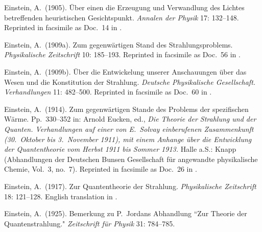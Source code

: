 \documentclass[12pt]{elsart}
\begin{document}
{\begin{thebibliography}{}
 Einstein, A.\ (1905). \"Uber einen die Erzeugung und Verwandlung des Lichtes betreffenden heuristischen Gesichtspunkt. {\it Annalen der Physik} 17: 132--148. Reprinted in facsimile as Doc.\ 14 in \citep[Vol.\ 2]{Einstein 1987--2006}. 

 Einstein, A.\ (1909a). Zum gegenw\"artigen Stand des Strahlungsproblems. {\it Physikalische Zeitschrift} 10: 185--193. Reprinted in facsimile as Doc.\ 56 in \citep[Vol.\ 2]{Einstein 1987--2006}.

 Einstein, A.\ (1909b). \"Uber die Entwickelung unserer Anschauungen \"uber das Wesen und die Konstitution der Strahlung. {\it Deutsche Physikalische Gesellschaft. Verhandlungen} 11: 482--500. Reprinted in facsimile as Doc.\ 60 in \citep[Vol.\ 2]{Einstein 1987--2006}.

 Einstein, A.\ (1914). Zum gegenw\"artigen Stande des Problems der spezifischen W\"arme. Pp.\ 330--352 in: Arnold Eucken, ed., {\it Die Theorie der Strahlung und der Quanten. Verhandlungen auf einer von E.\ Solvay einberufenen Zusammenkunft (30.\ Oktober bis 3.\ November 1911), mit einem Anhange \"uber die Entwicklung der Quantentheorie vom Herbst 1911 bis Sommer 1913.} Halle a.S.: Knapp (Abhandlungen der Deutschen Bunsen Gesellschaft f\"ur angewandte physikalische Chemie, Vol.\ 3, no.\ 7). Reprinted in facsimile as Doc.\ 26 in \citep[Vol.\ 3]{Einstein 1987--2006}.



 Einstein, A.\ (1917). Zur Quantentheorie der Strahlung. {\it Physikalische Zeitschrift} 18: 121--128. English translation in \citep[pp.\ 63--77]{Van der Waerden}.

 Einstein, A.\ (1925). Bemerkung zu P.\ Jordans Abhandlung ``Zur Theorie der Quantenstrahlung." {\it Zeitschrift f\"{u}r Physik} 31: 784--785.



\end{thebibliography}}
\end{document}
